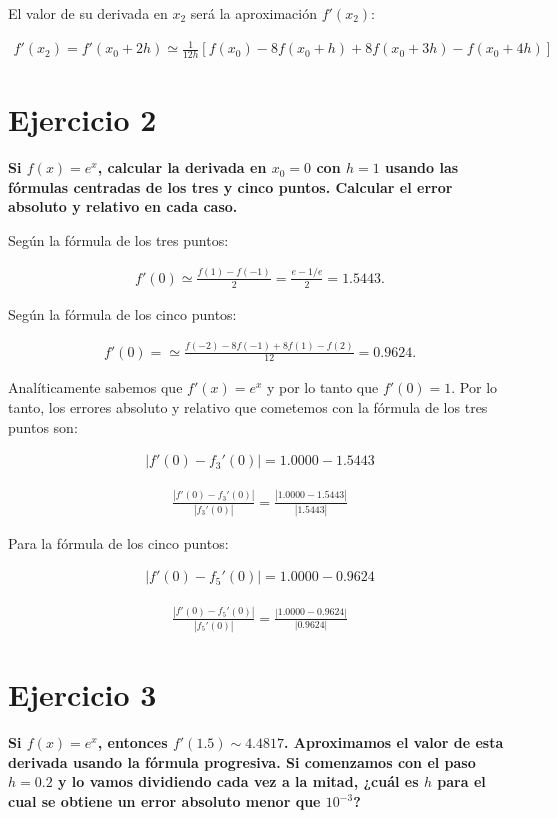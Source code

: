 \documentclass[12pt,a4paper,oneside,draft]{report}
\begin{document}
El valor de su derivada en $x_2$ será la aproximación $f'(x_2)$:

\begin{align}
f'(x_2) = f'(x_0 + 2h) \simeq \displaystyle\frac{1}{12h}[f(x_0) - 8f(x_0 + h) + 8f(x_0 + 3h) - f(x_0 + 4h)]
\end{align}

\section{Ejercicio 2}

\textbf{Si $f(x) = e^x$, calcular la derivada en $x_0 = 0$ con $h = 1$ usando las fórmulas centradas de los tres y cinco puntos. Calcular el error absoluto y relativo en cada caso.}

Según la fórmula de los tres puntos:

\begin{align}
  f'(0) \simeq \displaystyle\frac{f(1) - f(-1)}{2} = \displaystyle\frac{e - 1/e}{2} = 1.5443.
\end{align}

Según la fórmula de los cinco puntos:

\begin{align}
  f'(0) = \simeq \displaystyle\frac{f(-2) - 8f(-1) + 8f(1) -f(2)}{12} = 0.9624.
\end{align}

Analíticamente sabemos que $f'(x) = e^x$ y por lo tanto que $f'(0) = 1$. Por lo tanto, los errores absoluto y relativo que cometemos con la fórmula de los tres puntos son:

\begin{align}
  |f'(0) - f_3'(0)| = 1.0000 - 1.5443
\end{align}

\begin{align}
  \displaystyle\frac{|f'(0) - f_3'(0)|}{|f_3'(0)|} = \displaystyle\frac{|1.0000 - 1.5443|}{|1.5443|}
\end{align}

Para la fórmula de los cinco puntos:

\begin{align}
  |f'(0) - f_5'(0)| = 1.0000 - 0.9624
\end{align}

\begin{align}
  \displaystyle\frac{|f'(0) - f_5'(0)|}{|f_5'(0)|} = \displaystyle\frac{|1.0000 - 0.9624|}{|0.9624|}
\end{align}

\section{Ejercicio 3}

\textbf{Si $f(x) = e^x$, entonces $f'(1.5) \sim 4.4817$. Aproximamos el valor de esta derivada usando la fórmula progresiva. Si comenzamos con el paso $h = 0.2$ y lo vamos dividiendo cada vez a la mitad, ¿cuál es $h$ para el cual se obtiene un error absoluto menor que $10^{-3}$?}
\end{document}
